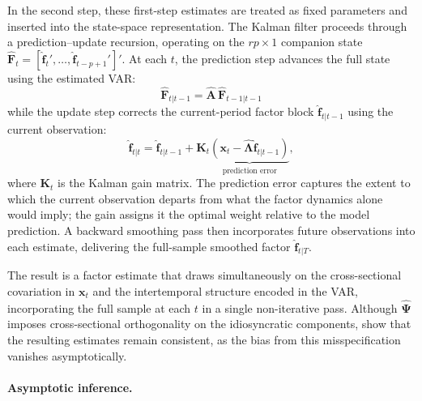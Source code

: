 In the second step, these first-step estimates are treated as fixed parameters and inserted into the state-space representation. The Kalman filter proceeds through a prediction--update recursion, operating on the $rp \times 1$ companion state $\hat{\boldsymbol{F}}_t = [\hat{\boldsymbol{f}}_t', \dots, \hat{\boldsymbol{f}}_{t-p+1}']'$. At each $t$, the prediction step advances the full state using the estimated VAR:
\begin{equation}
\hat{\boldsymbol{F}}_{t|t-1} = \hat{\boldsymbol{A}}\,\hat{\boldsymbol{F}}_{t-1|t-1}
\end{equation}
while the update step corrects the current-period factor block $\hat{\boldsymbol{f}}_{t|t-1}$ using the current observation:
\begin{equation}
\hat{\boldsymbol{f}}_{t|t}
  = \hat{\boldsymbol{f}}_{t|t-1}
    + \boldsymbol{K}_t
      \underbrace{\!\left(\boldsymbol{x}_t
        - \hat{\boldsymbol{\Lambda}}\hat{\boldsymbol{f}}_{t|t-1}\right)\!}
        _{\text{prediction error}},
\label{eq:kalman_update}
\end{equation}
where $\boldsymbol{K}_t$ is the Kalman gain matrix. The prediction error captures the extent to which the current observation departs from what the factor dynamics alone would imply; the gain assigns it the optimal weight relative to the model prediction. A backward smoothing pass then incorporates future observations into each estimate, delivering the full-sample smoothed factor $\hat{\boldsymbol{f}}_{t|T}$.

The result is a factor estimate that draws simultaneously on the cross-sectional covariation in $\boldsymbol{x}_t$ and the intertemporal structure encoded in the VAR, incorporating the full sample at each $t$ in a single non-iterative pass. Although $\hat{\boldsymbol{\Psi}}$ imposes cross-sectional orthogonality on the idiosyncratic components, \citet{doz2011two} show that the resulting estimates remain consistent, as the bias from this misspecification vanishes asymptotically.

\paragraph{Asymptotic inference.}

